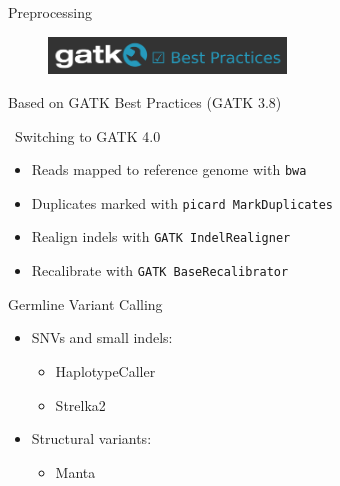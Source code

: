 \documentclass[usepdftitle=false]{beamer}
\begin{document}
\begin{frame}{Preprocessing}
	\begin{figure}
		\includegraphics[height=1cm]{pictures/GATKBP}
	\end{figure}
	Based on GATK Best Practices (GATK 3.8)

	\faWrench\ Switching to GATK 4.0
	\pause

	\begin{itemize}
		\item Reads mapped to reference genome with \texttt{bwa}
		\pause
		\item Duplicates marked with \texttt{picard MarkDuplicates}
		\pause
		\item Realign indels with \texttt{GATK IndelRealigner}
		\pause
		\item Recalibrate with \texttt{GATK BaseRecalibrator}
	\end{itemize}

\end{frame}

\begin{frame}{Germline Variant Calling}
	\begin{itemize}
		\item SNVs and small indels:
		\pause
	\begin{itemize}
			\item HaplotypeCaller
			\item Strelka2
		\end{itemize}
		\pause
		\item Structural variants:
		\pause
		\begin{itemize}
			\item Manta
		\end{itemize}
	\end{itemize}
\end{frame}
\end{document}
